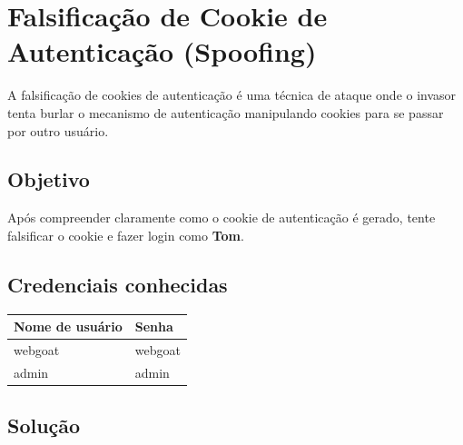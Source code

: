 \documentclass[11pt]{ifscarticle}
\begin{document}


\section{Falsificação de Cookie de Autenticação (Spoofing)}

A falsificação de cookies de autenticação é uma técnica de ataque onde o invasor tenta burlar o mecanismo de autenticação manipulando cookies para se passar por outro usuário.

\subsection{Objetivo}

Após compreender claramente como o cookie de autenticação é gerado, tente falsificar o cookie e fazer login como \textbf{Tom}.

\subsection{Credenciais conhecidas}

\begin{center}
\begin{tabular}{|l|l|}
    \hline
    \textbf{Nome de usuário} & \textbf{Senha} \\
    \hline
    webgoat                 & webgoat        \\
    \hline
    admin                   & admin          \\
    \hline
\end{tabular}
\end{center}

\subsection{Solução}
\end{document}
